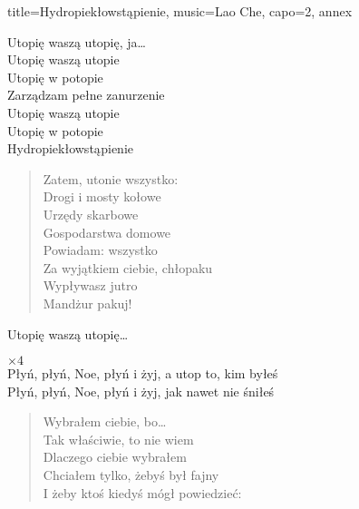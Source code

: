 \begin{song}{title={Hydropiekłowstąpienie}, music={Lao Che}, capo=2, annex}
\begin{multicols}{2}
\begin{chorus}
        Utopię waszą utopię, ja\ldots \smallskip \\
        Utopię waszą utopie \\
        Utopię w potopie \\
        Zarządzam pełne zanurzenie \smallskip \\
        Utopię waszą utopie \\
        Utopię w potopie \\
        Hydropiekłowstąpienie
    \end{chorus}
    \begin{verse}
        Zatem, utonie wszystko: \smallskip \\
        Drogi i mosty kołowe \\
        Urzędy skarbowe \\
        Gospodarstwa domowe \smallskip \\
        Powiadam: wszystko \\
        Za wyjątkiem ciebie, chłopaku \\
        Wypływasz jutro \\
        Mandżur pakuj!
    \end{verse}
    \begin{chorus}
        Utopię waszą utopię\ldots
    \end{chorus}
    \begin{interlude}
            $\times 4$ \medskip \\
        Płyń, płyń, Noe, płyń i żyj, a utop to, kim byłeś \\
        Płyń, płyń, Noe, płyń i żyj, jak nawet nie śniłeś
    \end{interlude}
    \begin{verse}
        Wybrałem ciebie, bo\ldots \\
        Tak właściwie, to nie wiem \\
        Dlaczego ciebie wybrałem \smallskip \\
        Chciałem tylko, żebyś był fajny \\
        I żeby ktoś kiedyś mógł powiedzieć: \smallskip \\
    \end{verse}
    \begin{chorus}

\end{chorus}
\end{multicols}
\end{song}

